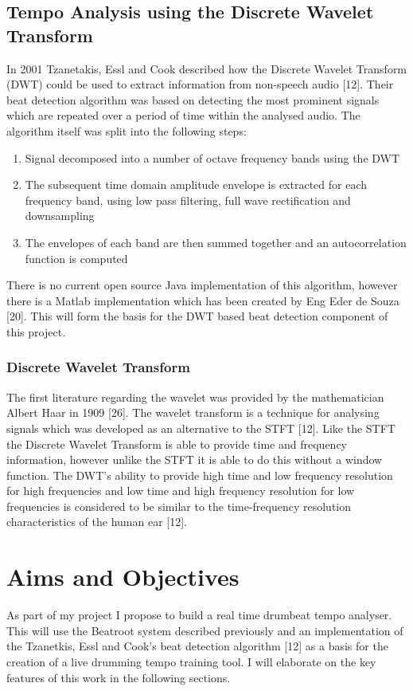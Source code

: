 \documentclass[a4paper, 11pt]{article}
\begin{document}
\subsection{Tempo Analysis using the Discrete Wavelet Transform}
In 2001 Tzanetakis, Essl and Cook described how the Discrete Wavelet Transform (DWT) could be used to extract information from non-speech audio [12]. Their beat detection algorithm was based on detecting the most prominent signals which are repeated over a period of time within the analysed audio. The algorithm itself was split into the following steps: 

\begin{enumerate}
\item Signal decomposed into a number of octave frequency bands using the DWT
\item The subsequent time domain amplitude envelope is extracted for each frequency band, using low pass filtering, full wave rectification and downsampling
\item The envelopes of each band are then summed together and an autocorrelation function is computed
\end{enumerate}

There is no current open source Java implementation of this algorithm, however there is a Matlab implementation which has been created by Eng Eder de Souza [20]. This will form the basis for the DWT based beat detection component of this project.


\subsubsection{Discrete Wavelet Transform}
The first literature regarding the wavelet was provided by the mathematician Albert Haar in 1909 [26]. The wavelet transform is a technique for analysing signals which was developed as an alternative to the STFT [12]. Like the STFT the Discrete Wavelet Transform is able to provide time and frequency information, however unlike the STFT it is able to do this without a window function. The DWT's ability to provide high time and low frequency resolution for high frequencies and low time and high frequency resolution for low frequencies is considered to be similar to the time-frequency resolution characteristics of the human ear [12].

\maketitle{}
\section{Aims and Objectives}
As part of my project I propose to build a real time drumbeat tempo analyser. This will use the Beatroot system described previously and an implementation of the Tzanetkis, Essl and Cook's beat detection algorithm [12] as a basis for the creation of a live drumming tempo training tool. I will elaborate on the key features of this work in the following sections.
\end{document}
